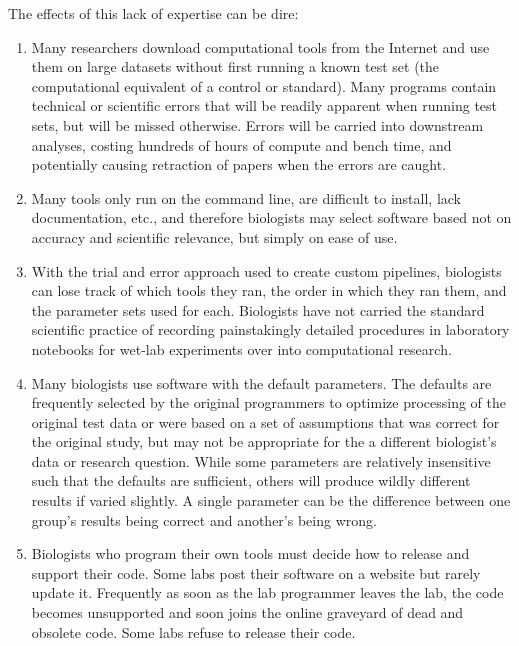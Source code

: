 \documentclass[ChapterTOCs,krantz2]{krantz} %
\begin{document}
The effects of this lack of expertise can be dire:  
\begin{enumerate}
\item Many researchers download computational tools from the Internet 
and use them on large datasets without first
running a known test set
(the computational equivalent of a control or standard).  Many programs contain
technical or scientific errors that will be readily apparent when running 
test sets, but will be missed otherwise\cite{Kelly2008}. Errors will be
carried into downstream analyses, costing
hundreds of hours of compute and bench time, and 
potentially causing retraction of papers when the errors are caught\cite{Merali2010}.  

\item Many tools only run on the command line, are difficult to install, lack
documentation, etc., and therefore biologists may
select software based not on accuracy and scientific relevance, but simply on
ease of use.  

\item With the trial and error
approach used to create custom pipelines, biologists can
lose track of which tools they ran, the order in which they ran them, and the
parameter sets used for each.  Biologists have not carried 
the standard scientific practice of recording
painstakingly detailed procedures in laboratory notebooks for wet-lab
experiments over into computational research.

\item Many biologists use software with the default parameters.  
The defaults are frequently selected by the original
programmers to optimize processing of the original test data or were based on a
set of assumptions that was correct for the original study, but may not be appropriate
for the a different biologist's data or research question.  While some parameters 
are relatively insensitive such that the defaults are sufficient, others 
will produce wildly different results if varied slightly.  
A single parameter
can be the difference between one group's results being correct and another's
being wrong.  

\item Biologists who program their own tools must decide how
to release and support their code.
Some labs post their software on a website but rarely update it.  
Frequently as soon as the lab programmer
leaves the lab, the code becomes unsupported and soon
joins the online graveyard of dead and obsolete code.  
Some labs refuse to release their code\cite{Morin2012}.  
\end{enumerate}
\end{document}
